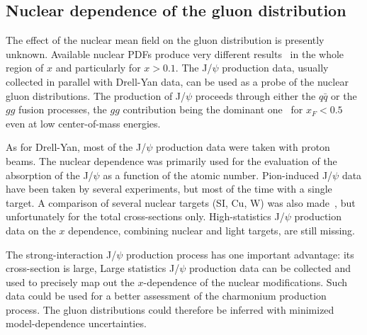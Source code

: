  \subsection{Nuclear dependence of the gluon distribution}

The effect of the nuclear mean field on the gluon distribution is presently unknown. Available nuclear PDFs produce 
very different results~\cite{Cazaroto:2008qh} in the whole region of $x$ and particularly for $x > 0.1$.
The J/$\psi$ production data, 
usually collected in parallel with Drell-Yan data, can be used as a probe of the nuclear gluon distributions. 
The production of J/$\psi$ proceeds through either the $q\bar q$ or the $gg$ fusion processes, the $gg$ 
contribution being the dominant one~\cite{Vogt:1999dw} for $x_F < 0.5$  even at low center-of-mass energies. 

As for Drell-Yan, most of the J/$\psi$ production data were taken with proton beams. The nuclear dependence 
was primarily used for the evaluation of the absorption of the J/$\psi$ as a function of the atomic number. 
Pion-induced J/$\psi$ data have been taken by several experiments, but most of the time with a single target. 
A comparison of several nuclear targets (SI, Cu, W) was also made~\cite{Alexandrov:1999ch},  
but unfortunately for the total cross-sections only. High-statistics J/$\psi$ production data on   
the $x$ dependence, combining nuclear and light targets, are still missing. 

The strong-interaction J/$\psi$ production process has one important advantage: its cross-section is large, 
Large statistics J/$\psi$ production data can be collected and 
used to precisely map out the $x$-dependence of the nuclear modifications. Such data could be 
used for a better assessment of the charmonium production process.  The gluon distributions could 
therefore be inferred with minimized model-dependence uncertainties.  

